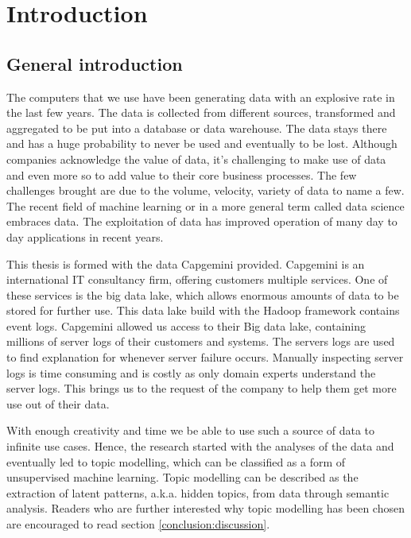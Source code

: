\chapter{Introduction} \label{ch:introduction}

\section{General introduction}\label{introduction:Generalinformation}
The computers that we use have been generating data with an explosive rate in the last few years. The data is collected from different sources, transformed and aggregated to be put into a database or data warehouse. The data stays there and has a huge probability to never be used and eventually to be lost. Although companies acknowledge the value of data, it's challenging to make use of data and even more so to add value to their core business processes. The few challenges brought are due to the volume, velocity, variety of data to name a few. The recent field of machine learning or in a more general term called data science embraces data. The exploitation of data has improved operation of many day to day applications in recent years. 

This thesis is formed with the data Capgemini provided. Capgemini is an international IT consultancy firm, offering customers multiple services. One of these services is the big data lake, which allows enormous amounts of data to be stored for further use. This data lake build with the Hadoop framework contains event logs. Capgemini allowed us access to their Big data lake, containing millions of server logs of their customers and systems. The servers logs are used to find explanation for whenever server failure occurs. Manually inspecting server logs is time consuming and is costly as only domain experts understand the server logs. This brings us to the request of the company to help them get more use out of their data. 

With enough creativity and time we be able to use such a source of data to infinite use cases. Hence, the research started with the analyses of the data and eventually led to topic modelling, which can be classified as a form of unsupervised machine learning. Topic modelling can be described as the extraction of latent patterns, a.k.a. hidden topics, from data through semantic analysis. Readers who are further interested why topic modelling has been chosen are encouraged to read section \ref{conclusion:discussion}. 

